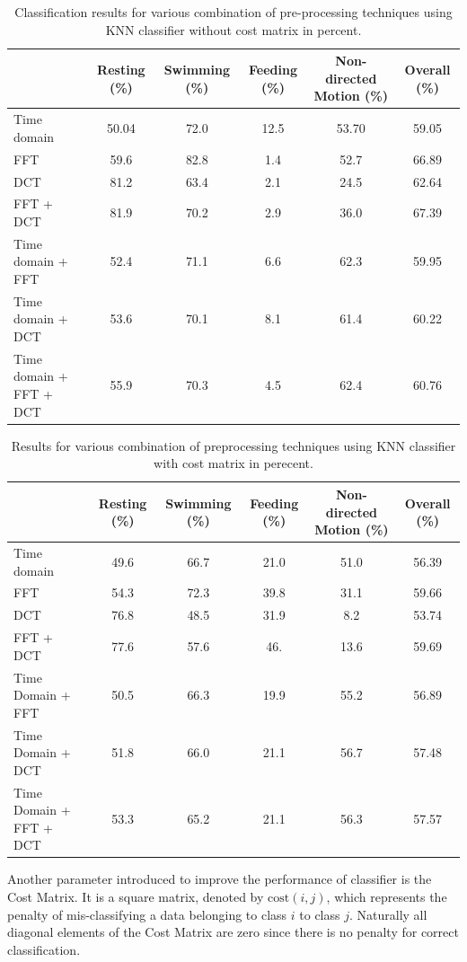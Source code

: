 \documentclass[conference]{IEEEtran}
\begin{document}
\begin{table}[h]
	\centering
	\caption{Classification results for various combination of pre-processing techniques using KNN classifier without cost matrix in percent.}
	\begin{tabular}{l c c c c c}
	\hline
	& \textbf{Resting} (\%) & \textbf{Swimming}  (\%) & \textbf{Feeding}  (\%) & \textbf{Non-directed Motion}  (\%) & \textbf{Overall}  (\%) \\
	\hline
	Time domain & 50.04&	72.0&	12.5&	53.70&	59.05\\
     FFT & 59.6&	82.8&	1.4&	52.7&	66.89\\
     DCT & 81.2&	63.4&	2.1&	24.5&	62.64 \\
   FFT + DCT & 81.9&	70.2&	2.9&	36.0& 	67.39\\
	Time domain + FFT & 52.4& 	71.1&	6.6&	62.3&	59.95 \\
	Time domain + DCT & 53.6& 	70.1&	8.1&	61.4&	60.22\\
	Time domain + FFT + DCT & 55.9&	70.3&	4.5&	62.4&	60.76 \\
	\hline
	\end{tabular}
	\label{without cost matrix}
\end{table}

\begin{table}[h]
	\centering
	\caption{Results for various combination of preprocessing techniques using KNN classifier with cost matrix in perecent.}
	\begin{tabular}{l c c c c c}
	\hline
	& \textbf{Resting} (\%) & \textbf{Swimming}  (\%) & \textbf{Feeding}  (\%) & \textbf{Non-directed Motion}  (\%) & \textbf{Overall}  (\%) \\
	\hline
	Time domain & 49.6	&66.7&	21.0&	51.0&	56.39\\
     FFT & 54.3&	72.3&	39.8&	31.1&	59.66\\
     DCT & 76.8&	48.5&	31.9&	8.2&	53.74\\
   FFT + DCT & 77.6&	57.6&	46.&	13.6&	59.69\\
	Time Domain + FFT & 50.5&	66.3&	19.9&	55.2&	56.89\\
	Time Domain + DCT & 51.8&	66.0&	21.1&	56.7&	57.48\\
	Time Domain + FFT + DCT & 53.3&	65.2&	21.1&	56.3&	57.57\\
	\hline
	\end{tabular}
	\label{without cost matrix}
\end{table}

Another parameter introduced to improve the performance of classifier is the Cost Matrix. It is a square matrix, denoted by $\mathrm{cost}(i, j)$, which represents the penalty of mis-classifying a data belonging to class $i$ to class $j$.  Naturally all diagonal elements of the Cost Matrix are zero since there is no penalty for correct classification. 
\end{document}
